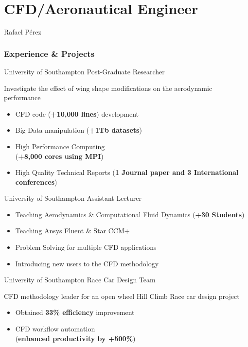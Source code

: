 \documentclass[fontsize=10pt]{tccv}
\begin{document}
\part{CFD/Aeronautical Engineer}{Rafael P\'erez}

\section{Experience \& Projects}
\begin{eventlist}
     {University of Southampton}
     {Post-Graduate Researcher}

Investigate the effect of wing shape modifications on
the aerodynamic performance
\begin{itemize}
	\itemsep -1pt
	\item CFD code (\textbf{+10,000 lines}) development
	\item Big-Data manipulation (\textbf{+1Tb datasets})
	\item High Performance Computing\\ (\textbf{+8,000 cores using MPI})
	\item High Quality Technical Reports (\textbf{1 Journal paper and 3 International
	conferences})
\end{itemize}

	{University of Southampton}
	{Assistant Lecturer}
\begin{itemize}
	\itemsep -1pt
	\item Teaching Aerodynamics \& Computational Fluid Dynamics (\textbf{+30 Students})
	\item Teaching Ansys Fluent \& Star CCM+
	\item Problem Solving for multiple CFD applications
	\item Introducing new users to the CFD methodology
\end{itemize}

     {University of Southampton}
     {Race Car Design Team}

CFD methodology leader for an open wheel Hill Climb Race car design project
     \begin{itemize}
	\itemsep -1pt
     	\item Obtained \textbf{33\% efficiency} improvement
     	\item CFD workflow automation \\(\textbf{enhanced productivity by +500\%})
     \end{itemize}


\end{eventlist}
\end{document}
